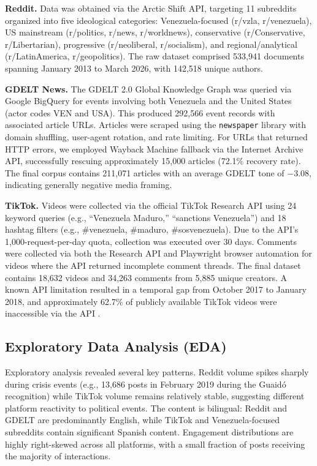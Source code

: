 \documentclass[12pt, letterpaper]{article}
\begin{document}
\textbf{Reddit.} Data was obtained via the Arctic Shift API, targeting 11 subreddits organized into five ideological categories: Venezuela-focused (r/vzla, r/venezuela), US mainstream (r/politics, r/news, r/worldnews), conservative (r/Conservative, r/Libertarian), progressive (r/neoliberal, r/socialism), and regional/analytical (r/LatinAmerica, r/geopolitics). The raw dataset comprised 533,941 documents spanning January 2013 to March 2026, with 142,518 unique authors.

\textbf{GDELT News.} The GDELT 2.0 Global Knowledge Graph was queried via Google BigQuery for events involving both Venezuela and the United States (actor codes VEN and USA). This produced 292,566 event records with associated article URLs. Articles were scraped using the \texttt{newspaper} library with domain shuffling, user-agent rotation, and rate limiting. For URLs that returned HTTP errors, we employed Wayback Machine fallback via the Internet Archive API, successfully rescuing approximately 15,000 articles (72.1\% recovery rate). The final corpus contains 211,071 articles with an average GDELT tone of $-3.08$, indicating generally negative media framing.

\textbf{TikTok.} Videos were collected via the official TikTok Research API using 24 keyword queries (e.g., ``Venezuela Maduro,'' ``sanctions Venezuela'') and 18 hashtag filters (e.g., \#venezuela, \#maduro, \#sosvenezuela). Due to the API's 1,000-request-per-day quota, collection was executed over 30 days. Comments were collected via both the Research API and Playwright browser automation for videos where the API returned incomplete comment threads. The final dataset contains 18,632 videos and 34,263 comments from 5,885 unique creators. A known API limitation resulted in a temporal gap from October 2017 to January 2018, and approximately 62.7\% of publicly available TikTok videos were inaccessible via the API \cite{aiforensics2024tiktok}.

\subsection{Exploratory Data Analysis (EDA)}

Exploratory analysis revealed several key patterns. Reddit volume spikes sharply during crisis events (e.g., 13,686 posts in February 2019 during the Guaid\'{o} recognition) while TikTok volume remains relatively stable, suggesting different platform reactivity to political events. The content is bilingual: Reddit and GDELT are predominantly English, while TikTok and Venezuela-focused subreddits contain significant Spanish content. Engagement distributions are highly right-skewed across all platforms, with a small fraction of posts receiving the majority of interactions.
\end{document}
